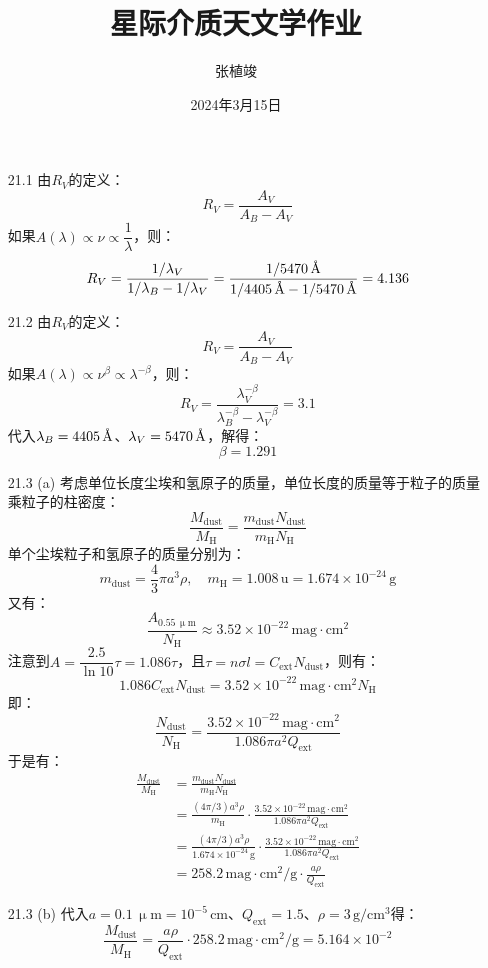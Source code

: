 \documentclass[a4paper,fontset=none]{ctexart}
\title{\textbf{星际介质天文学作业}}
\author{张植竣}
\date{2024年3月15日}
\newcommand{\um}{\upmu\mathrm{m}}
\newcommand{\ang}{\text{\r{A}}}
\begin{document}
\maketitle

\begin{enumerate}
    \item[21.1]
    由$R_V$的定义：
    \[
        R_V = \frac{A_V}{A_B - A_V}
    \]
    如果$A(\lambda) \propto \nu \propto \dfrac{1}{\lambda}$，则：
    \[
        R_V = \frac{1/\lambda_V}{1/\lambda_B - 1/\lambda_V} = \frac{1/5470\,\ang}{1/4405\,\ang - 1/5470\,\ang} = 4.136
    \]

    \bigskip
    \item[21.2]
    由$R_V$的定义：
    \[
        R_V = \frac{A_V}{A_B - A_V}
    \]
    如果$A(\lambda) \propto \nu^\beta \propto \lambda^{-\beta}$，则：
    \[
        R_V = \frac{\lambda_V^{-\beta}}{\lambda_B^{-\beta} - \lambda_V^{-\beta}} = 3.1
    \]
    代入$\lambda_B = 4405\,\ang$、$\lambda_V = 5470\,\ang$，解得：
    \[
        \beta = 1.291
    \]

    \bigskip
    \item[21.3 (a)]
    考虑单位长度尘埃和氢原子的质量，单位长度的质量等于粒子的质量乘粒子的柱密度：
    \[
    \frac{M_{\mathrm{dust}}}{M_{\mathrm{H}}} = \frac{m_{\mathrm{dust}} N_{\mathrm{dust}}}{m_{\mathrm{H}} N_{\mathrm{H}}}
    \]
    单个尘埃粒子和氢原子的质量分别为：
    \[
        m_{\mathrm{dust}} = \frac{4}{3}\pi a^3 \rho,\quad m_{\mathrm{H}} = 1.008\,\mathrm{u} = 1.674 \times 10^{-24}\,\mathrm{g}
    \]
    又有：
    \[
        \frac{A_{0.55\,\um}}{N_{\mathrm{H}}} \approx 3.52 \times 10^{-22}\,\mathrm{mag \cdot cm^2}
    \]
    注意到$A = \dfrac{2.5}{\ln{10}} \tau = 1.086\tau$，且$\tau = n\sigma l = C_{\mathrm{ext}} N_{\mathrm{dust}}$，则有：
    \[
        1.086 C_{\mathrm{ext}} N_{\mathrm{dust}} = 3.52 \times 10^{-22}\,\mathrm{mag \cdot cm^2} N_{\mathrm{H}}
    \]
    即：
    \[
        \frac{N_{\mathrm{dust}}}{N_{\mathrm{H}}} = \frac{3.52 \times 10^{-22}\,\mathrm{mag \cdot cm^2}}{1.086\pi a^2 Q_{\mathrm{ext}}}
    \]
    于是有：
    \begin{align*}
        \frac{M_{\mathrm{dust}}}{M_{\mathrm{H}}}
        &= \frac{m_{\mathrm{dust}} N_{\mathrm{dust}}}{m_{\mathrm{H}} N_{\mathrm{H}}} \\
        &= \frac{(4\pi/3)a^3 \rho}{m_{\mathrm{H}}} \cdot \frac{3.52 \times 10^{-22}\,\mathrm{mag \cdot cm^2}}{1.086\pi a^2 Q_{\mathrm{ext}}} \\
        &= \frac{(4\pi/3)a^3 \rho}{1.674 \times 10^{-24}\,\mathrm{g}} \cdot \frac{3.52 \times 10^{-22}\,\mathrm{mag \cdot cm^2}}{1.086\pi a^2 Q_{\mathrm{ext}}} \\
        &= 258.2\,\mathrm{mag \cdot cm^2/g} \cdot \frac{a\rho}{Q_{\mathrm{ext}}}
    \end{align*}

    \medskip
    \item[21.3 (b)]
    代入$a = 0.1\,\um = 10^{-5}\,\mathrm{cm}$、$Q_{\mathrm{ext}} = 1.5$、$\rho = 3\,\mathrm{g/cm^3}$得：
    \[
        \frac{M_{\mathrm{dust}}}{M_{\mathrm{H}}} = \frac{a\rho}{Q_{\mathrm{ext}}} \cdot 258.2\,\mathrm{mag \cdot cm^2/g} = 5.164 \times 10^{-2}
    \]

\end{enumerate}
\end{document}
